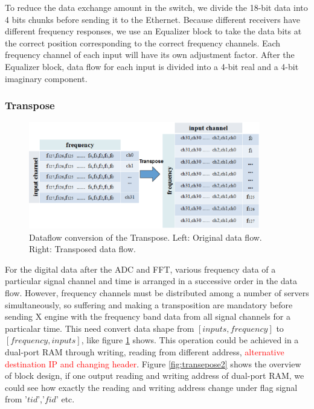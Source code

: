 \documentclass{ws-jai}
\begin{document}
	To reduce the data exchange amount in the switch, we divide the 18-bit data into 4 bits chunks before sending it to the Ethernet.  Because different receivers have different frequency responses, we use an Equalizer block to take the data bits at the correct position corresponding to the correct frequency channels. Each frequency channel of each input will have its own adjustment factor. After the Equalizer block, data flow for each input is divided into a 4-bit real and a 4-bit imaginary component. 

\subsubsection{Transpose\label{sec:Transpose}}	
\begin{figure}[t]
 \centering
 \includegraphics[width=0.9\textwidth]{./picture/transpose.eps}
\caption{Dataflow conversion of the Transpose. Left: Original data flow. Right: Transposed data flow.\label{fig:transepose}}
\end{figure}


   For the digital data after the ADC and FFT, various frequency data of a particular signal channel and time  is arranged in a successive order in the data flow. However, frequency channels must be distributed among a number of servers simultaneously, so suffering and making a transposition are mandatory before sending X engine with the frequency band data from all signal channels for a particalar time.  
        This need convert data shape from $[inputs,frequency]$ to $[frequency,inputs]$, like figure \ref{fig:transepose} shows. This operation could be achieved in a dual-port RAM through writing, reading from different address,\textcolor{red}{ alternative destination IP and changing header}.  Figure \ref{fig:transepose2} shows the overview of block design, if one output reading and writing address of dual-port RAM, we could see how exactly the reading and writing address change under flag signal from '$tid$','$fid$' etc.
\end{document}
